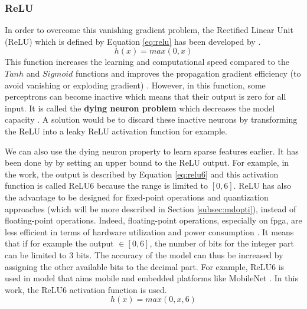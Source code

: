 \subsubsection{ReLU}
In order to overcome this vanishing gradient problem, the Rectified Linear Unit (ReLU) which is defined by Equation \eqref{eq:relu} has been developed by \textcite{krizhevsky_imagenet_2012}.
%
\begin{equation}
    h(x) = max(0, x)
    \label{eq:relu}
\end{equation}
%
This function increases the learning and computational speed compared to the $Tanh$ and $Sigmoid$ functions and improves the propagation gradient efficiency (to avoid vanishing or exploding gradient) \cite{maas_rectier_2014, abdelouahab_accelerating_2018}. However, in this function, some perceptrons can become inactive which means that their output is zero for all input. It is called the \textbf{dying neuron problem} which decreases the model capacity \cite{matteucci_artificial_2019}. A solution would be to discard these inactive neurons by transforming the ReLU into a leaky ReLU \cite{maas_rectier_2014} activation function for example.

We can also use the dying neuron property to learn sparse features earlier. It has been done by \textcite{krizhevsky_convolutional_nodate} by setting an upper bound to the ReLU output. For example, in the work, the output is described by Equation \eqref{eq:relu6} and this activation function is called ReLU6 because the range is limited to $[0, 6]$. ReLU has also the advantage to be designed for fixed-point operations and quantization approaches (which will be more described in Section \ref{subsec:mdopti}), instead of floating-point operations. Indeed, floating-point operations, especially on \acrshort{fpga}, are less efficient in terms of hardware utilization and power consumption \cite{david_hardware_2007}. It means that if for example the output $ \in [0, 6]$, the number of bits for the integer part can be limited to 3 bits. The accuracy of the model can thus be increased by assigning the other available bits to the decimal part. For example, ReLU6 is used in model that aims mobile and embedded platforms like MobileNet \cite{howard_mobilenets_2017}. In this work, the ReLU6 activation function is used.
%
\begin{equation}
    h(x) = max(0, x, 6)
    \label{eq:relu6}
\end{equation}

